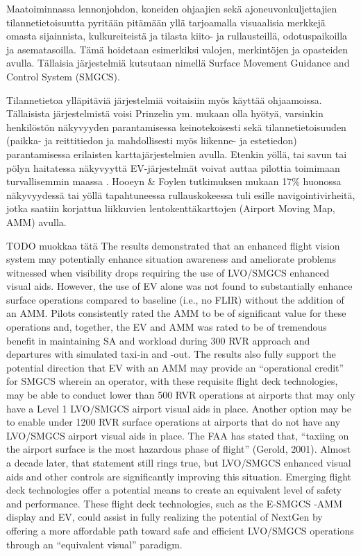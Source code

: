 \documentclass[utf8,bachelor,manualbib]{gradu3}
\begin{document}
Maatoiminnassa lennonjohdon, koneiden ohjaajien sekä ajoneuvonkuljettajien tilannetietoisuutta pyritään pitämään yllä tarjoamalla visuaalisia merkkejä omasta sijainnista, kulkureiteistä ja tilasta kiito- ja rullausteillä, odotuspaikoilla ja asematasoilla. Tämä hoidetaan esimerkiksi valojen, merkintöjen ja opasteiden avulla. Tällaisia järjestelmiä kutsutaan nimellä Surface Movement Guidance and Control System (SMGCS). \citep{prinzel2013}

Tilannetietoa ylläpitäviä järjestelmiä voitaisiin myös käyttää ohjaamoissa. Tällaisista järjestelmistä voisi Prinzelin ym. \citeyearpar{prinzel2013} mukaan olla hyötyä, varsinkin henkilöstön näkyvyyden parantamisessa keinotekoisesti sekä tilannetietoisuuden (paikka- ja reittitiedon ja mahdollisesti myös liikenne- ja estetiedon) parantamisessa erilaisten karttajärjestelmien avulla. Etenkin yöllä, tai savun tai pölyn haitatessa näkyvyyttä EV-järjestelmät voivat auttaa pilottia toimimaan turvallisemmin maassa \citep{prinzel2013}. Hooeyn \& Foylen \citeyearpar{hooey2007} tutkimuksen mukaan 17\% huonossa näkyvyydessä tai yöllä tapahtuneessa rullauskokeessa tuli esille navigointivirheitä, jotka saatiin korjattua liikkuvien lentokenttäkarttojen (Airport Moving Map, AMM) avulla.

TODO muokkaa tätä
The results demonstrated that an enhanced flight vision system may potentially enhance situation awareness and ameliorate problems witnessed when visibility drops requiring the use of LVO/SMGCS enhanced visual aids. However, the use of EV alone was not found to substantially enhance surface operations compared to baseline (i.e., no FLIR) without the addition of an AMM. Pilots consistently rated the AMM to be of significant value for these operations and, together, the EV and AMM was rated to be of tremendous benefit in maintaining SA and workload during 300 RVR approach and departures with simulated taxi-in and -out. The results also fully support the potential direction that EV with an AMM may provide an “operational credit” for SMGCS wherein an operator, with these requisite flight deck technologies, may be able to conduct lower than 500 RVR operations at airports that may only have a Level 1 LVO/SMGCS airport visual aids in place. Another option may be to enable under 1200 RVR surface operations at airports that do not have any LVO/SMGCS airport visual aids in place.
The FAA has stated that, “taxiing on the airport surface is the most hazardous phase of flight” (Gerold, 2001). Almost a decade later, that statement still rings true, but LVO/SMGCS enhanced visual aids and other controls are significantly improving this situation. Emerging flight deck technologies offer a potential means to create an equivalent level of safety and performance. These flight deck technologies, such as the E-SMGCS -AMM display and EV, could assist in fully realizing the potential of NextGen by offering a more affordable path toward safe and efficient LVO/SMGCS operations through an “equivalent visual” paradigm.\citep{prinzel2013}
\end{document}
